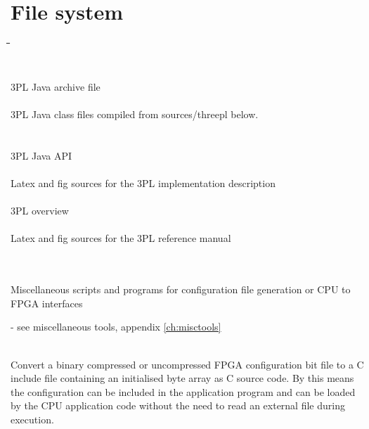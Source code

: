 \pagebreak

\chapter{File system}

    
    
    \begin{tabbing}
    \hspace*{2em}\=\hspace*{2em}\=\hspace*{2em}\=\hspace*{2em}\=\hspace*{2em}\=\hspace*{2em}\=\\
    \\
        \>\\
            \>\>\>3PL Java archive file\\
        \>\\
            \>\>\>3PL Java class files compiled from sources/threepl below.\\

    \\
        \>\\
            \>\>\>3PL Java API\\
        \>\\
            \>\>\>Latex and fig sources for the 3PL implementation description\\

        \>\\
            \>\>\>3PL overview\\

        \>\\
            \>\>\>Latex and fig sources for the 3PL reference manual\\
    \\
        \>\\
            \>\>\>\parbox[t]{12cm}{Miscellaneous scripts and programs for configuration file generation
            or CPU to FPGA interfaces} - see miscellaneous tools, appendix \ref{ch:misctools}\\
        \>\>\\
            \>\>\>\>\parbox[t]{12cm}{Convert a binary compressed or uncompressed FPGA configuration
                bit file to a C include file containing an initialised byte
                array as C source code. By this means the configuration can be
                included in the application program and can be loaded by the CPU
                application code without the need to read an external file
                during execution.}\\


\end{tabbing}
